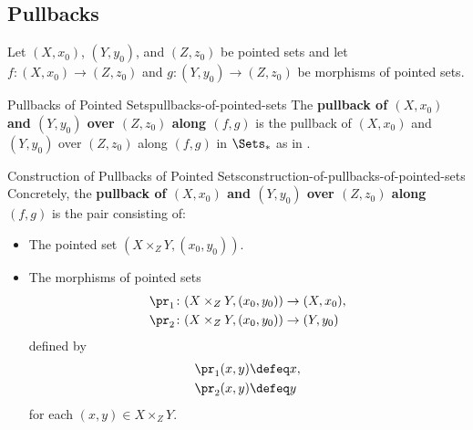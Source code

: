 \subsection{Pullbacks}\label{subsection-pullbacks-of-pointed-sets}
Let $(X,x_{0})$, $(Y,y_{0})$, and $(Z,z_{0})$ be pointed sets and let $f\colon(X,x_{0})\to(Z,z_{0})$ and $g\colon(Y,y_{0})\to(Z,z_{0})$ be morphisms of pointed sets.
\begin{definition}{Pullbacks of Pointed Sets}{pullbacks-of-pointed-sets}%
    The \textbf{pullback of $(X,x_{0})$ and $(Y,y_{0})$ over $(Z,z_{0})$ along $(f,g)$} is the pullback of $(X,x_{0})$ and $(Y,y_{0})$ over $(Z,z_{0})$ along $(f,g)$ in $\Sets_{*}$ as in .
\end{definition}
\begin{construction}{Construction of Pullbacks of Pointed Sets}{construction-of-pullbacks-of-pointed-sets}%
    Concretely, the \textbf{pullback of $(X,x_{0})$ and $(Y,y_{0})$ over $(Z,z_{0})$ along $(f,g)$} is the pair consisting of:
    \begin{itemize}
        \item{}The pointed set $(X\times_{Z}Y,(x_{0},y_{0}))$.
        \item{}The morphisms of pointed sets
            \begin{align*}
                \pr_{1} &\colon (X\times_{Z}Y,(x_{0},y_{0}))\to (X,x_{0}),\\
                \pr_{2} &\colon (X\times_{Z}Y,(x_{0},y_{0}))\to (Y,y_{0})
            \end{align*}
            defined by
            \begin{align*}
                \pr_{1}(x,y) &\defeq x,\\
                \pr_{2}(x,y) &\defeq y
            \end{align*}
            for each $(x,y)\in X\times_{Z}Y$.
    \end{itemize}
\end{construction}
